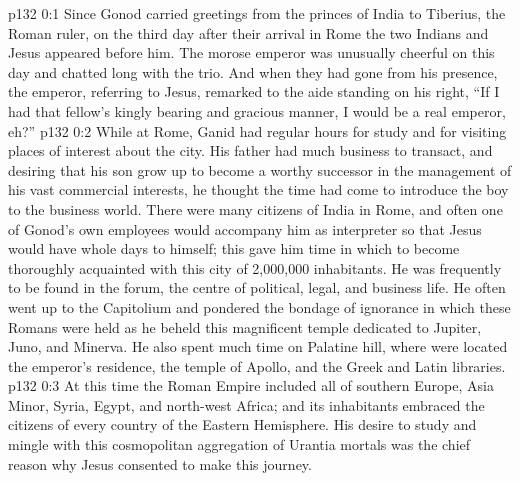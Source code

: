 \author{Midwayer Commission}
\vs p132 0:1 Since Gonod carried greetings from the princes of India to Tiberius, the Roman ruler, on the third day after their arrival in Rome the two Indians and Jesus appeared before him. The morose emperor was unusually cheerful on this day and chatted long with the trio. And when they had gone from his presence, the emperor, referring to Jesus, remarked to the aide standing on his right, “If I had that fellow’s kingly bearing and gracious manner, I would be a real emperor, eh?”
\vs p132 0:2 \pc While at Rome, Ganid had regular hours for study and for visiting places of interest about the city. His father had much business to transact, and desiring that his son grow up to become a worthy successor in the management of his vast commercial interests, he thought the time had come to introduce the boy to the business world. There were many citizens of India in Rome, and often one of Gonod’s own employees would accompany him as interpreter so that Jesus would have whole days to himself; this gave him time in which to become thoroughly acquainted with this city of 2,000,000 inhabitants. He was frequently to be found in the forum, the centre of political, legal, and business life. He often went up to the Capitolium and pondered the bondage of ignorance in which these Romans were held as he beheld this magnificent temple dedicated to Jupiter, Juno, and Minerva. He also spent much time on Palatine hill, where were located the emperor’s residence, the temple of Apollo, and the Greek and Latin libraries.
\vs p132 0:3 \pc At this time the Roman Empire included all of southern Europe, Asia Minor, Syria, Egypt, and north\hyp{}west Africa; and its inhabitants embraced the citizens of every country of the Eastern Hemisphere. His desire to study and mingle with this cosmopolitan aggregation of Urantia mortals was the chief reason why Jesus consented to make this journey.
